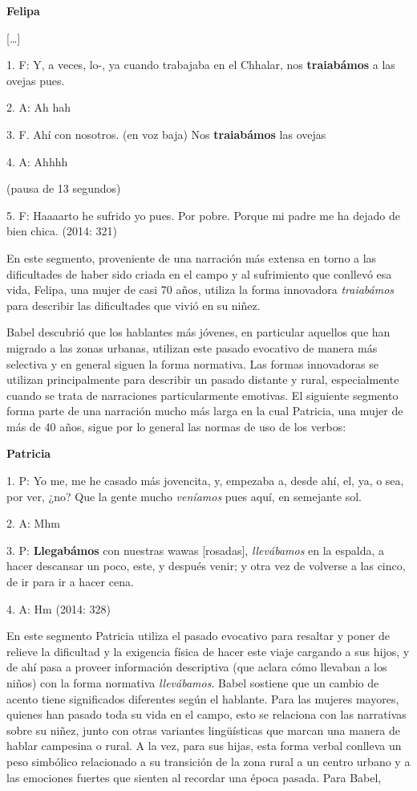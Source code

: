 \documentclass[output=paper]{langscibook}
\begin{document}
\ea
\textbf{Felipa} 

[…]

1. F: Y, a veces, lo-, ya cuando trabajaba en el Chhalar, nos \textbf{traiabámos} a las ovejas pues.

2. A: Ah hah

3. F. Ahí con nosotros. (en voz baja) Nos \textbf{traiabámos} las ovejas

4. A: Ahhhh

(pausa de 13 segundos)

5. F: Haaaarto he sufrido yo pues. Por pobre. Porque mi padre me ha dejado de bien chica. (2014: 321)
\z

En este segmento, proveniente de una narración más extensa en torno a las dificultades de haber sido criada en el campo y al sufrimiento que conllevó esa vida, Felipa, una mujer de casi 70 años, utiliza la forma innovadora \emph {traiabámos} para describir las dificultades que vivió en su niñez.

Babel descubrió que los hablantes más jóvenes, en particular aquellos que han migrado a las zonas urbanas, utilizan este pasado evocativo de manera más selectiva y en general siguen la forma normativa. Las formas innovadoras se utilizan principalmente para describir un pasado distante y rural, especialmente cuando se trata de narraciones particularmente emotivas. El siguiente segmento forma parte de una narración mucho más larga en la cual Patricia, una mujer de más de 40 años, sigue por lo general las normas de uso de los verbos:


\ea
\textbf{Patricia}

1. P: Yo me, me he casado más jovencita, y, empezaba a, desde ahí, el, ya, o sea, por ver, ¿no? Que la gente mucho \textit{veníamos} pues aquí, en semejante sol.

2. A: Mhm

3. P: \textbf{Llegabámos} con nuestras wawas [rosadas], \textit{llevábamos} en la espalda, a hacer descansar un poco, este, y después venir; y otra vez de volverse a las cinco, de ir para ir a hacer cena.

4. A: Hm (2014: 328)
\z

En este segmento Patricia utiliza el pasado evocativo para resaltar y poner de relieve la dificultad y la exigencia física de hacer este viaje cargando a sus hijos, y de ahí pasa a proveer información descriptiva (que aclara cómo llevaban a los niños) con la forma normativa \emph {llevábamos}. Babel sostiene que un cambio de acento tiene significados diferentes según el hablante. Para las mujeres mayores, quienes han pasado toda su vida en el campo, esto se relaciona con las narrativas sobre su niñez, junto con otras variantes lingüísticas que marcan una manera de hablar campesina o rural. A la vez, para sus hijas, esta forma verbal conlleva un peso simbólico relacionado a su transición de la zona rural a un centro urbano y a las emociones fuertes que sienten al recordar una época pasada. Para Babel, 
\end{document}
